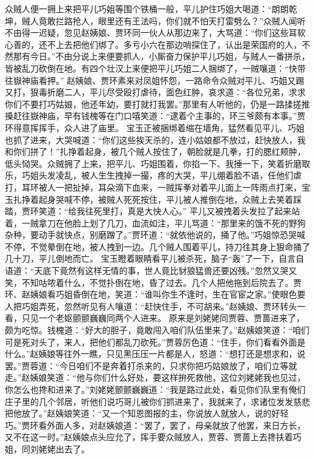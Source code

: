 \documentclass[12pt,oneside]{book}
\begin{document}
众贼人便一拥上来把平儿巧姐等围个铁桶一般，平儿护住巧姐大喝道：“朗朗乾坤，贼人竟敢拦路抢人，眼里还有王法吗，你们就不怕天打雷劈么？”众贼人闻听不由得一迟疑，忽见赵姨娘、贾环同一伙人从那边来了，大骂道：“你们这些耳软心善的，还不上去把他们绑了。多亏小六在那边哨探住了，认出是荣国府的人，不然那有今日。”不由分说上来便要抓人，小厮奋力保护平儿巧姐，与贼人一番拼杀，皆被乱刀砍倒在地。有四个壮汉上来便把平儿巧姐二人捆绑了，一贼嚷道：“快带往嶽神庙看押。”
赵姨娘、贾环素来对凤姐怀怨，一路命令众贼对平儿、巧姐又踢又打，狠毒折磨二人，平儿尽受殴打虐待，面色红肿，哀求道：“各位兄弟，求求你们不要打巧姑娘，他还年幼，要打就打我罢。”那里有人听他的，仍是一路揉搓推搡赶往嶽神庙，早有钱槐等在门口嘻笑道：“逮着个主事的，环三爷颇有本事。”贾环得意挥挥手，众人进了庙里。
宝玉正被捆绑着缩在墙角，猛然看见平儿、巧姐也抓了进来，大哭喊道：“你们这些挨天杀的，连小姑娘都不放过，赶快放人，我和你们拼了！”扎挣着起身，被几个贼人按住了，朝脸就是几拳，打的腮红颊肿，低头恸哭。众贼拥了上来，把平儿、巧姐围着，你掐一下、我捶一下，笑着折磨取乐，巧姐头发凌乱，被人生生拽掉一撮，疼的大哭，平儿绷着脸不语，任他们虐打，耳环被人一把扯掉，耳朵滴下血来，一贼挥拳对着平儿面上一阵雨点打来，宝玉扎挣着起身哭喊不停，被贼人死死按住，平儿被人推倒在地，众贼上去笑着踩踏，贾环笑道：“给我往死里打，真是大快人心。”
平儿又被拽着头发拉了起来站着，一贼拿刀在他脸上划了几刀，血流如注，平儿骂道：“那里来的饿不死的野狗杂种，要动手就快点，别磨蹭了。”贾环道：“就依他说的，捅了他。”巧姐惊恐哭喊不停，不觉晕倒在地，被人拽到一边。几个贼人围着平儿，持刀往其身上狠命捅了几十刀，平儿倒地而亡。
宝玉瞪着眼睛看平儿被杀死，脑子“轰”了一下，自言自语道：“天底下竟然有这样无情的事，世人竟比豺狼猛兽还要凶残。”忽然又哭又笑，不知咕哝着什么，不觉扑倒在地，昏了过去。几个人把他拖到后院去了。贾环、赵姨娘看巧姐昏倒在地，笑道：“谁叫你生不逢时，生在官宦之家。”使眼色要人把巧姐弄死，忽然听见有人嚷道：“赶快住手，不可胡来。”赵姨娘、贾环转头一看，只见一个老妪颤颤巍巍同两个人进来。
原来是刘姥姥同贾蓉、贾蔷进来了，颇为吃惊。钱槐道：“好大的胆子，竟敢闯入咱们队伍里来了。”赵姨娘笑道：“咱们可是死对头了，来人，把他们都乱刀砍死。”贾蓉厉色道：“住手，你们看看外面是什么。”赵姨娘等往外一瞧，只见黑压压一片都是人，怒道：“想打还是想求和，说罢。”贾蓉道：“今日咱们不是奔着打杀来的，只求你把巧姑娘放了，咱们立等就走。”赵姨娘笑道：“他与你们什么好处，要这样拚死救他，这位刘姥姥我也见过，你怎么也搀和进来了。”刘姥姥颤颤巍巍道：“我是路过此处，看见你们队里有俺们庄子里的几个邻居，听他们说巧哥儿被你们抓进来了，我就来了，求诸位发发慈悲把他放了。”赵姨娘笑道：“又一个知恩图报的主，你说放人就放人，说的好轻巧。”贾环看外面人多，对赵姨娘道：“罢了，罢了，母亲就放了他罢，来日方长，又不在这一时。”赵姨娘点头应允了，挥手要众贼放人，贾蓉、贾蔷上去搀扶着巧姐，同刘姥姥出去了。
\end{document}
